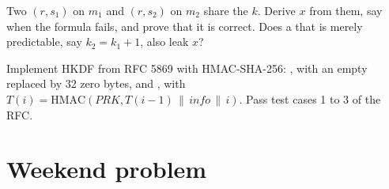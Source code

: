 \begin{exercise}[$\star\star\star$]\label{exo:b3:public-key-cryptography:11}
Two  $(r, s_1)$ on $m_1$ and $(r, s_2)$ on $m_2$ share the  $k$. Derive $x$ from them, say when the formula fails, and prove that it is correct. Does a  that is merely predictable, say $k_2 = k_1 + 1$, also leak $x$?
\end{exercise}

\begin{exercise}[$\star\star\star$]\label{exo:b3:public-key-cryptography:12}
Implement HKDF from RFC 5869 with HMAC-SHA-256: , with an empty  replaced by 32 zero bytes, and , with $T(i) = \mathrm{HMAC}(\mathit{PRK}, T(i - 1) \,\|\, \mathit{info} \,\|\, i)$. Pass test cases 1 to 3 of the RFC.
\end{exercise}

\section{Weekend problem}\label{sec:b3:public-key-cryptography:problem}

